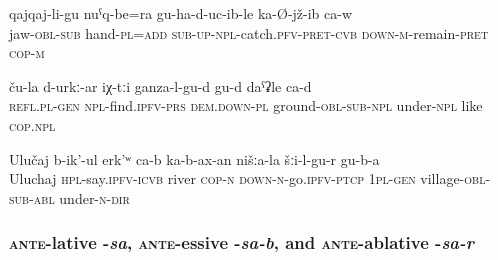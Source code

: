 \begin{exe}	
	\ex	\label{He is sitting with his hands holding his head}
	\gll	qajqaj-li-gu	nuˁq-be=ra	gu-ha-d-uc-ib-le	ka-Ø-jž-ib ca-w\\
		jaw-\textsc{obl}-\textsc{sub}	hand-\textsc{pl}=\textsc{add}	\textsc{sub-up-npl}-catch.\textsc{pfv}-\textsc{pret}-\textsc{cvb}	\textsc{down-m}-remain-\textsc{pret} \textsc{cop-m}\\
	\glt	{}
	
	\ex	\label{Their, these (vegetables) are probably (growing) under the ground}
	\gll	ču-la	d-urkː-ar	iχ-tːi	ganza-l-gu-d	gu-d	daˁʡle	ca-d\\
		\textsc{refl}.\textsc{pl}-\textsc{gen}	\textsc{npl}-find.\textsc{ipfv}-\textsc{prs}	\textsc{dem.down-pl}	ground-\textsc{obl}-\textsc{sub}-\textsc{npl}	under-\textsc{npl}	like	\textsc{cop.npl}\\
	\glt	{}

	
	\ex	\label{The river with the name Uluchaj is passing by down from our village}
	\gll	Ulučaj	b-ik'-ul	erk'ʷ	ca-b	ka-b-ax-an	nišːa-la	šːi-l-gu-r	gu-b-a\\
		Uluchaj	\textsc{hpl}-say.\textsc{ipfv}-\textsc{icvb}	river	\textsc{cop-n}	\textsc{down-n}-go.\textsc{ipfv}-\textsc{ptcp}	1\textsc{pl}-\textsc{gen}	village-\textsc{obl}-\textsc{sub}-\textsc{abl}	under-\textsc{n}-\textsc{dir}\\
	\glt	{}
\end{exe}


\subsubsection{\textsc{ante}-lative -\textit{sa}, \textsc{ante}-essive -\textit{sa-b}, and \textsc{ante}-ablative -\textit{sa-r}}
\label{sssec:ante-lative -sa, ante-essive -sa-b, and ante-ablative -sa-r}

